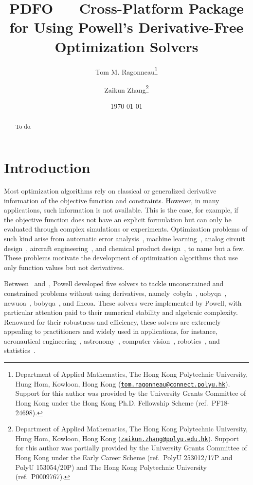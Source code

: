 \documentclass[11pt,draft]{article}
\title{PDFO --- Cross-Platform Package for Using Powell's Derivative-Free Optimization Solvers}
\author{
    Tom M. Ragonneau\thanks{
        Department of Applied Mathematics,
        The Hong Kong Polytechnic University,
        Hung Hom, Kowloon, Hong Kong
        (\href{mailto:tom.ragonneau@connect.polyu.hk}{\texttt{tom.ragonneau@connect.polyu.hk}}).
        Support for this author was provided by the University Grants Committee of Hong Kong under the Hong Kong Ph.D. Fellowship Scheme (ref.\ PF18-24698).
    }
    \and Zaikun Zhang\thanks{
        Department of Applied Mathematics,
        The Hong Kong Polytechnic University,
        Hung Hom, Kowloon, Hong Kong
        (\href{mailto:zaikun.zhang@polyu.edu.hk}{\texttt{zaikun.zhang@polyu.edu.hk}}).
        Support for this author was partially provided by the University Grants Committee of Hong Kong under the  Early Career Scheme (ref.\ PolyU 253012/17P and PolyU 153054/20P) and The Hong Kong Polytechnic University (ref.\ P0009767).
    }
}
\date{\today}
\numberwithin{equation}{section}
\begin{document}
\maketitle

\begin{abstract}
    To do.
\end{abstract}

\section{Introduction}

Most optimization algorithms rely on classical or generalized derivative information of the objective function and constraints.
However, in many applications, such information is not available.
This is the case, for example, if the objective function does not have an explicit formulation but can only be evaluated through complex simulations or experiments.
Optimization problems of such kind arise from automatic error analysis~\cite{Higham_1993,Higham_2002}, machine learning~\cite{Ghanbari_Scheinberg_2017}, analog circuit design~\cite{Latorre_Etal_2019}, aircraft engineering~\cite{Gazaix_Etal_2019}, and chemical product design~\cite{Sun_Etal_2020}, to name but a few.
These problems motivate the development of optimization algorithms that use only function values but not derivatives.

Between~\citeyear{Powell_1994} and~\citeyear{Powell_2015}, Powell developed five solvers to tackle unconstrained and constrained problems without using derivatives,
namely~\gls{cobyla}~\cite{Powell_1994}, \gls{uobyqa}~\cite{Powell_2002}, \gls{newuoa}~\cite{Powell_2006}, \gls{bobyqa}~\cite{Powell_2009}, and \gls{lincoa}.
These solvers were implemented by Powell, with particular attention paid to their numerical stability and algebraic complexity.
Renowned for their robustness and efficiency, these solvers are extremely appealing to practitioners and widely used in applications, for instance, aeronautical engineering~\cite{Gallard_Etal_2018b}, astronomy~\cite{Biviano_Etal_2013,Mamon_Biviano_Boue_2013}, computer vision~\cite{Izadinia_Shan_Seitz_2017}, robotics~\cite{Mombaur_Truong_Laumond_2010}, and statistics~\cite{Bates_Etal_2015}.
\end{document}
